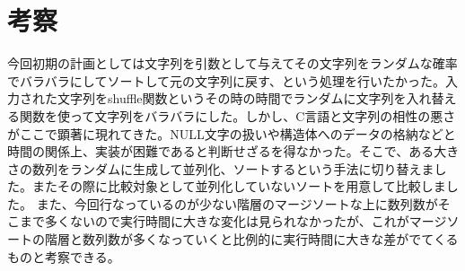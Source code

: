 \documentclass[11pt,a4paper]{jsarticle}
\begin{document}
\section*{考察}
今回初期の計画としては文字列を引数として与えてその文字列をランダムな確率でバラバラにしてソートして元の文字列に戻す、という処理を行いたかった。入力された文字列をshuffle関数というその時の時間でランダムに文字列を入れ替える関数を使って文字列をバラバラにした。しかし、C言語と文字列の相性の悪さがここで顕著に現れてきた。NULL文字の扱いや構造体へのデータの格納などと時間の関係上、実装が困難であると判断せざるを得なかった。そこで、ある大きさの数列をランダムに生成して並列化、ソートするという手法に切り替えました。またその際に比較対象として並列化していないソートを用意して比較しました。
また、今回行なっているのが少ない階層のマージソートな上に数列数がそこまで多くないので実行時間に大きな変化は見られなかったが、これがマージソートの階層と数列数が多くなっていくと比例的に実行時間に大きな差がでてくるものと考察できる。
\end{document}
